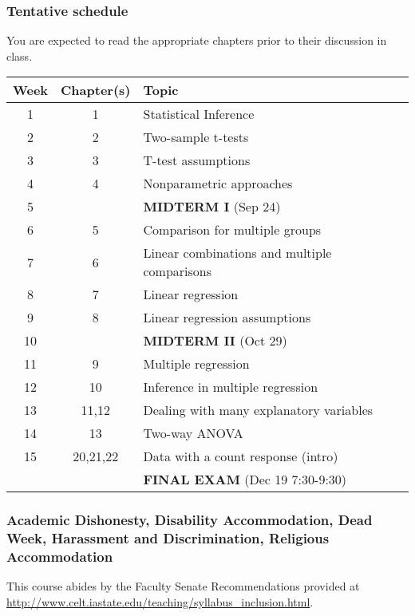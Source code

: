 \documentclass[12pt]{article}
\begin{document}
\subsubsection*{Tentative schedule}
You are expected to read the appropriate chapters prior to their discussion in class.
\begin{center}
\begin{tabular}{ccl}
Week & Chapter(s) & Topic \\
\hline
1 & 1 & Statistical Inference \\
2 & 2 & Two-sample t-tests \\
3 & 3 & T-test assumptions \\
4 & 4 & Nonparametric approaches \\
\hline
5 & & {\bf MIDTERM I} (Sep 24) \\
\hline
6 & 5 & Comparison for multiple groups \\
7 & 6 & Linear combinations and multiple comparisons \\
8 & 7 & Linear regression \\
9 & 8 & Linear regression assumptions \\
\hline
10 & & {\bf MIDTERM II} (Oct 29) \\
\hline
11 & 9 & Multiple regression \\
12 & 10 & Inference in multiple regression \\
13 & 11,12 & Dealing with many explanatory variables \\
14 & 13 & Two-way ANOVA \\
15 & 20,21,22 & Data with a count response (intro) \\
\hline
&& {\bf FINAL EXAM} (Dec 19 7:30-9:30) \\
\hline
\end{tabular}
\end{center}
\subsubsection*{Academic Dishonesty, Disability Accommodation, Dead Week, Harassment and Discrimination, Religious Accommodation}
This course abides by the Faculty Senate Recommendations provided at \url{http://www.celt.iastate.edu/teaching/syllabus_inclusion.html}.
\end{document}
